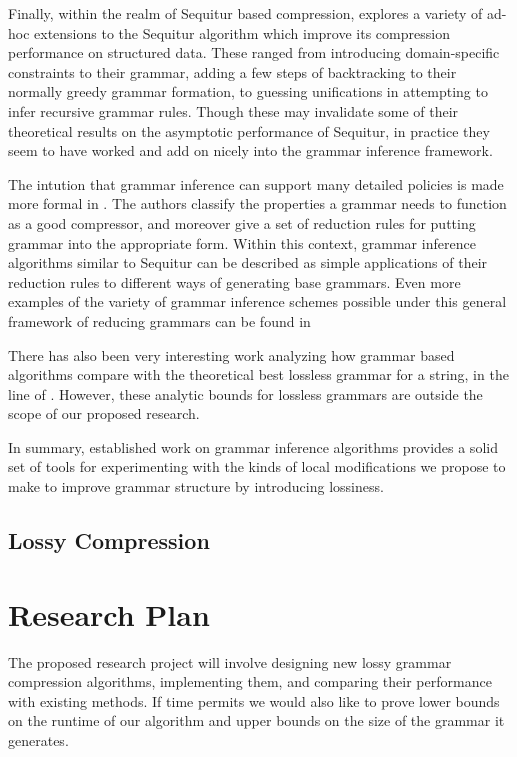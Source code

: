 \documentclass[11pt]{article}
\begin{document}
Finally, within the realm of Sequitur based compression, \cite{nevillphd}
explores a variety of ad-hoc extensions to the Sequitur algorithm which improve
its compression performance on structured data. These ranged from introducing
domain-specific constraints to their grammar, adding a few steps of
backtracking to their normally greedy grammar formation, to guessing
unifications in attempting to infer recursive grammar rules. Though these may
invalidate some of their theoretical results on the asymptotic performance of
Sequitur, in practice they seem to have worked and add on nicely into the
grammar inference framework.

The intution that grammar inference can support many detailed policies is made
more formal in \cite{grammarcodes}. The authors classify the properties a
grammar needs to function as a good compressor, and moreover give a set of
reduction rules for putting grammar into the appropriate form. Within this
context, grammar inference algorithms similar to Sequitur can be described as
simple applications of their reduction rules to different ways of generating
base grammars. Even more examples of the variety of grammar inference schemes
possible under this general framework of reducing grammars can be found in
\cite{efficientgreedy}

There has also been very interesting work analyzing how grammar based
algorithms compare with the theoretical best lossless grammar for a string, in
the line of \cite{approximation}. However, these analytic bounds for lossless
grammars are outside the scope of our proposed research.

In summary, established work on grammar inference algorithms provides a solid
set of tools for experimenting with the kinds of local modifications we propose
to make to improve grammar structure by introducing lossiness.

\subsection{Lossy Compression}

\section{Research Plan}

The proposed research project will involve designing new lossy grammar
compression algorithms, implementing them, and comparing their performance with
existing methods.  If time permits we would also like to prove lower bounds on
the runtime of our algorithm and upper bounds on the size of the grammar it
generates.
\end{document}
